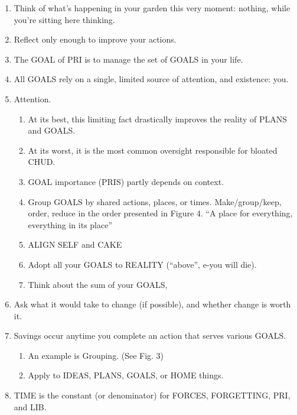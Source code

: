 \documentclass[
]{book}
\providecommand{\tightlist}{%
  \setlength{\itemsep}{0pt}\setlength{\parskip}{0pt}}
\begin{document}
\begin{enumerate}
\def\labelenumi{\arabic{enumi}.}
\setcounter{enumi}{30}
\item
  Think of what's happening in your garden this very moment: nothing, while
  you're sitting here thinking.
\item
  Reflect only enough to improve your actions.
\item
  The GOAL of PRI is to manage the set of GOALS in your life.
\item
  All GOALS rely on a single, limited source of attention, and existence: you.
\item
  Attention.

  \begin{enumerate}
  \def\labelenumii{\arabic{enumii}.}
  \tightlist
  \item
    At its best, this limiting fact drastically improves the reality of PLANS and GOALS.
  \item
    At its worst, it is the most common oversight responsible for bloated CHUD.
  \item
    GOAL importance (PRIS) partly depends on context.
  \item
    Group GOALS by shared actions, places, or times. Make/group/keep,
    order, reduce in the order presented in Figure 4. ``A place for everything,
    everything in its place''
  \item
    ALIGN SELF and CAKE
  \item
    Adopt all your GOALS to REALITY (``above'', e-you will die).
  \item
    Think about the sum of your GOALS,
  \end{enumerate}
\item
  Ask what it would take to change (if possible), and whether change is worth it.
\item
  Savings occur anytime you complete an action that serves various GOALS.

  \begin{enumerate}
  \def\labelenumii{\arabic{enumii}.}
  \tightlist
  \item
    An example is Grouping. (See Fig. 3)
  \item
    Apply to IDEAS, PLANS, GOALS, or HOME things.
  \end{enumerate}
\item
  TIME is the constant (or denominator) for FORCES, FORGETTING, PRI, and LIB.


\end{enumerate}
\end{document}
